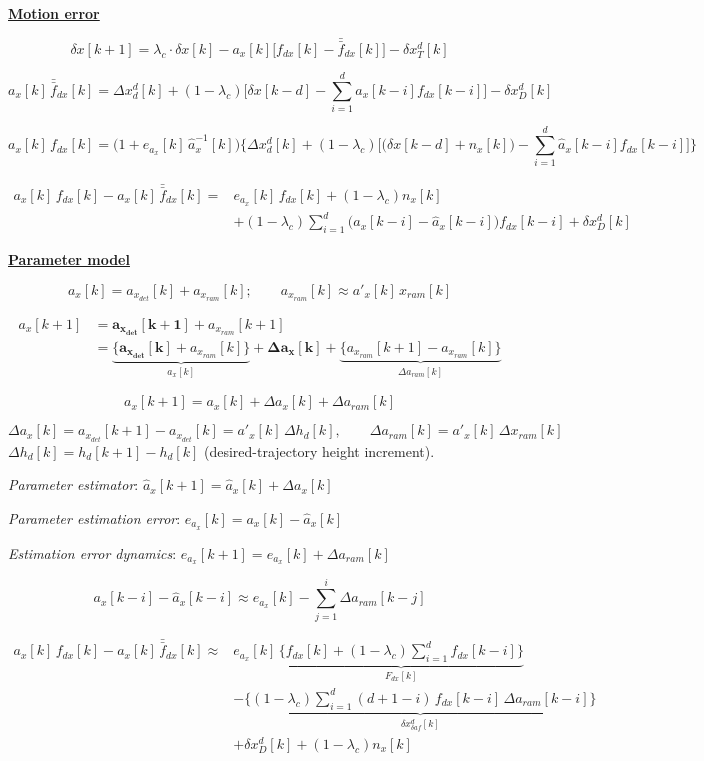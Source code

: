 \documentclass[11pt,a4paper,fontset=none]{ctexart}
\newcommand{\lc}{\lambda_c}
\newcommand{\hd}[1]{\par\medskip\noindent\underline{\textbf{#1}}\par\nobreak\vspace{0.2ex}}
\begin{document}
\hd{Motion error}
\[ \delta x[k+1] = \lc \cdot \delta x[k] - a_x[k]\big[ f_{dx}[k] - \bar{\bar f}_{dx}[k] \big] - \delta x_T^{d}[k] \]

\[ a_x[k]\,\bar{\bar f}_{dx}[k] = \Delta x_d^{d}[k] + (1-\lc)\Big[\delta x[k-d] - \textstyle\sum_{i=1}^{d} a_x[k-i] f_{dx}[k-i]\Big] - \delta x_D^{d}[k] \]

\[
a_x[k]\, f_{dx}[k] = \big(1 + e_{a_x}[k]\,\hat a_x^{-1}[k]\big)\Big\{ \Delta x_d^{d}[k]
+ (1-\lc)\Big[\big(\delta x[k-d] + n_x[k]\big) - \textstyle\sum_{i=1}^{d}\hat a_x[k-i] f_{dx}[k-i]\Big] \Big\}
\]

\[
\begin{aligned}
a_x[k]\, f_{dx}[k] - a_x[k]\,\bar{\bar f}_{dx}[k] ={}& e_{a_x}[k]\, f_{dx}[k] + (1-\lc) n_x[k] \\
&+ (1-\lc)\textstyle\sum_{i=1}^{d}\big(a_x[k-i] - \hat a_x[k-i]\big) f_{dx}[k-i] + \delta x_D^{d}[k]
\end{aligned}
\]

\hd{Parameter model}
\[ a_x[k] = a_{x_{det}}[k] + a_{x_{ram}}[k]; \qquad a_{x_{ram}}[k] \approx a'_x[k]\, x_{ram}[k] \]

\medskip
\[
\begin{aligned}
a_x[k+1] &= \bm{a_{x_{det}}[k+1]} + a_{x_{ram}}[k+1] \\[1.0ex]
&= \underbrace{\Big\{ \bm{a_{x_{det}}[k]} + a_{x_{ram}}[k] \Big\}}_{a_x[k]} + \bm{\Delta a_x[k]} + \underbrace{\Big\{ a_{x_{ram}}[k+1] - a_{x_{ram}}[k] \Big\}}_{\Delta a_{ram}[k]}
\end{aligned}
\]

\medskip
\[ a_x[k+1] = a_x[k] + \Delta a_x[k] + \Delta a_{ram}[k] \]

\bigskip
\[
\Delta a_x[k] = a_{x_{det}}[k+1] - a_{x_{det}}[k] = a'_x[k]\,\Delta h_d[k],
\qquad
\Delta a_{ram}[k] = a'_x[k]\,\Delta x_{ram}[k]
\]
$\Delta h_d[k] = h_d[k+1] - h_d[k]$ (desired-trajectory height increment).

\medskip
\textit{Parameter estimator}: \quad $\hat a_x[k+1] = \hat a_x[k] + \Delta a_x[k]$

\textit{Parameter estimation error}: \quad $e_{a_x}[k] = a_x[k] - \hat a_x[k]$

\textit{Estimation error dynamics}: \quad $e_{a_x}[k+1] = e_{a_x}[k] + \Delta a_{ram}[k]$

\newpage
\[ a_x[k-i] - \hat a_x[k-i] \approx e_{a_x}[k] - \sum_{j=1}^{i}\Delta a_{ram}[k-j] \]

\[
\begin{aligned}
a_x[k]\, f_{dx}[k] - a_x[k]\,\bar{\bar f}_{dx}[k] \approx{}&
e_{a_x}[k]\,\underbrace{\Big\{ f_{dx}[k] + (1-\lc)\textstyle\sum_{i=1}^{d} f_{dx}[k-i] \Big\}}_{F_{dx}[k]} \\
&- \underbrace{\Big\{ (1-\lc)\textstyle\sum_{i=1}^{d} (d+1-i)\, f_{dx}[k-i]\,\Delta a_{ram}[k-i] \Big\}}_{\delta x_{\delta af}^{d}[k]} \\
&+ \delta x_D^{d}[k] + (1-\lc) n_x[k]
\end{aligned}
\]
\end{document}
